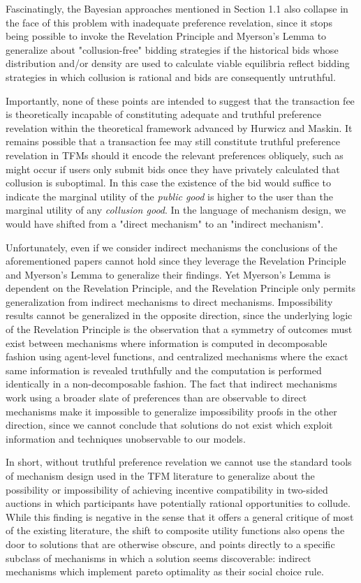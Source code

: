 \documentclass[oneside]{article}   	%
\begin{document}
Fascinatingly, the Bayesian approaches mentioned in Section 1.1 also collapse in the face of this problem with inadequate preference revelation, since it stops being possible to invoke the Revelation Principle and Myerson's Lemma to generalize about "collusion-free" bidding strategies if the historical bids whose distribution and/or density are used to calculate viable equilibria reflect bidding strategies in which collusion is rational and bids are consequently untruthful.

Importantly, none of these points are intended to suggest that the transaction fee is theoretically incapable of constituting adequate and truthful preference revelation within the theoretical framework advanced by Hurwicz and Maskin. It remains possible that a transaction fee may still constitute truthful preference revelation in TFMs should it encode the relevant preferences obliquely, such as might occur if users only submit bids once they have privately calculated that collusion is suboptimal. In this case the existence of the bid would suffice to indicate the marginal utility of the \textit{public good} is higher to the user than the marginal utility of any \textit{collusion good}. In the language of mechanism design, we would have shifted from a "direct mechanism" to an "indirect mechanism".

Unfortunately, even if we consider indirect mechanisms the conclusions of the aforementioned papers cannot hold since they leverage the Revelation Principle and Myerson's Lemma to generalize their findings. Yet Myerson's Lemma is dependent on the Revelation Principle, and the Revelation Principle only permits generalization from indirect mechanisms to direct mechanisms. Impossibility results cannot be generalized in the opposite direction, since the underlying logic of the Revelation Principle is the observation that a symmetry of outcomes must exist between mechanisms where information is computed in decomposable fashion using agent-level functions, and centralized mechanisms where the exact same information is revealed truthfully and the computation is performed identically in a non-decomposable fashion. The fact that indirect mechanisms work using a broader slate of preferences than are observable to direct mechanisms make it impossible to generalize impossibility proofs in the other direction, since we cannot conclude that solutions do not exist which exploit information and techniques unobservable to our models.

In short, without truthful preference revelation we cannot use the standard tools of mechanism design used in the TFM literature to generalize about the possibility or impossibility of achieving incentive compatibility in two-sided auctions in which participants have potentially rational opportunities to collude. While this finding is negative in the sense that it offers a general critique of most of the existing literature, the shift to composite utility functions also opens the door to solutions that are otherwise obscure, and points directly to a specific subclass of mechanisms in which a solution seems discoverable: indirect mechanisms which implement pareto optimality as their social choice rule.
\end{document}
